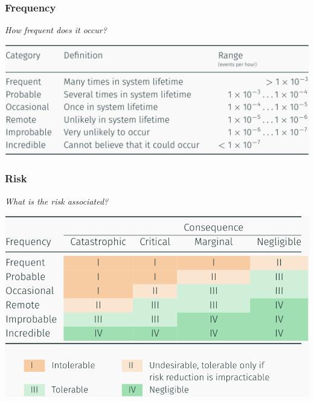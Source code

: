 \documentclass[
  10pt,
  a4paper,
  twocolumn]{article}
\begin{document}
\begin{minipage}[c][1cm][c]{.7\columnwidth}

\subsubsection{Frequency}\label{frequency}

\vspace{-2mm}{\color{Orchid}\faQuestionCircle[regular]} \emph{How
frequent does it occur?}

\end{minipage}%
\begin{minipage}[c][1cm][c]{.3\columnwidth}
\makebox[30mm][r]{
\resizebox{!}{0.9cm}{
  
}}
\end{minipage}

\includegraphics{images/safety/image-4.png}

\begin{minipage}[c][1cm][c]{.7\columnwidth}

\subsubsection{Risk}\label{risk}

\vspace{-2mm}{\color{Orchid}\faQuestionCircle[regular]} \emph{What is
the risk associated?}

\end{minipage}%
\begin{minipage}[c][1cm][c]{.3\columnwidth}
\makebox[30mm][r]{
\resizebox{!}{0.9cm}{
  
}}
\end{minipage}

\includegraphics{images/safety/image-5.png}
\end{document}
